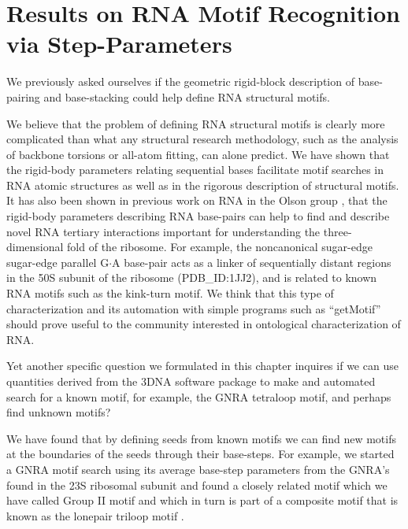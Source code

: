 
\section{Results on RNA Motif Recognition via Step-Parameters}

We previously asked ourselves if the geometric rigid-block description
of  base-pairing and  base-stacking could  help define  RNA structural
motifs.

We  believe that  the problem  of  defining RNA  structural motifs  is
clearly   more   complicated  than   what   any  structural   research
methodology,  such as the  analysis of  backbone torsions  or all-atom
fitting,  can  alone  predict.   We  have shown  that  the  rigid-body
parameters relating sequential bases  facilitate motif searches in RNA
atomic structures as well as in the rigorous description of structural
motifs. It  has also been shown in  previous work on RNA  in the Olson
group \cite{yurongthesis},  that the rigid-body  parameters describing
RNA  base-pairs can  help  to  find and  describe  novel RNA  tertiary
interactions important for understanding the three-dimensional fold of
the  ribosome.  For example,  the  noncanonical sugar-edge  sugar-edge
parallel G$\cdot$A base-pair acts  as a linker of sequentially distant
regions  in the  50S subunit  of the  ribosome (PDB\_ID:1JJ2),  and is
related to  known RNA  motifs such as  the kink-turn motif.   We think
that  this type  of characterization  and its  automation  with simple
programs  such as ``getMotif''  should prove  useful to  the community
interested in ontological characterization of RNA.

Yet another  specific question we formulated in  this chapter inquires
if we  can use  quantities derived from  the 3DNA software  package to
make and  automated search  for a known  motif, for example,  the GNRA
tetraloop motif, and perhaps find unknown motifs?

We have found that by defining seeds from known motifs we can find new
motifs at the  boundaries of the seeds through  their base-steps.  For
example, we  started a GNRA  motif search using its  average base-step
parameters  from the  GNRA's found  in the  23S ribosomal  subunit and
found a closely related motif which  we have called Group II motif and
which in turn is part of a composite motif \cite{nasalean2009} that is
known as the lonepair triloop motif \cite{lee2003}.

